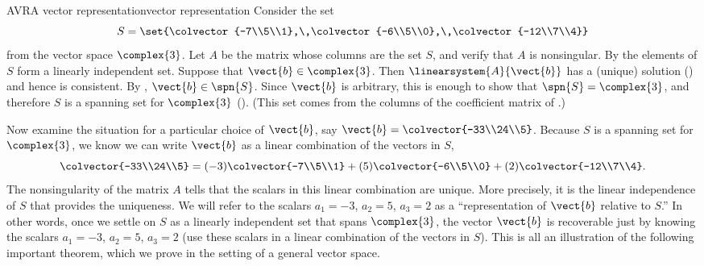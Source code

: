 \begin{example}{AVR}{A vector representation}{vector representation}
Consider the set
%
\begin{equation*}
S=\set{\colvector{-7\\5\\1},\,\colvector{-6\\5\\0},\,\colvector{-12\\7\\4}}
\end{equation*}
%
from the vector space $\complex{3}$.  Let $A$ be the matrix whose columns are the set $S$, and verify that $A$ is nonsingular.  By  the elements of $S$ form a linearly independent set.  Suppose that $\vect{b}\in\complex{3}$.  Then $\linearsystem{A}{\vect{b}}$ has a (unique) solution () and hence is consistent.  By , $\vect{b}\in\spn{S}$.  Since $\vect{b}$ is arbitrary, this is enough to show that $\spn{S}=\complex{3}$, and therefore $S$ is a spanning set for $\complex{3}$ ().  (This set comes from the columns of the coefficient matrix of .)\par
%
Now examine the situation for a particular choice of $\vect{b}$, say $\vect{b}=\colvector{-33\\24\\5}$.  Because $S$ is a spanning set for $\complex{3}$, we know we can write $\vect{b}$ as a linear combination of the vectors in $S$,
%
\begin{equation*}
\colvector{-33\\24\\5}=
(-3)\colvector{-7\\5\\1}+(5)\colvector{-6\\5\\0}+(2)\colvector{-12\\7\\4}.
\end{equation*}
%
The nonsingularity of the matrix $A$ tells that the scalars in this linear combination are unique.  More precisely, it is the linear independence of $S$ that provides the uniqueness.  We will refer to the scalars $a_1=-3$, $a_2=5$, $a_3=2$ as a ``representation of $\vect{b}$ relative to $S$.''  In other words, once we settle on $S$ as a linearly independent set that spans $\complex{3}$, the vector $\vect{b}$ is recoverable just by knowing the scalars $a_1=-3$, $a_2=5$, $a_3=2$ (use these scalars in a linear combination of the vectors in $S$).   This is all an illustration of the following important theorem, which we prove in the setting of a general vector space.
\end{example}
